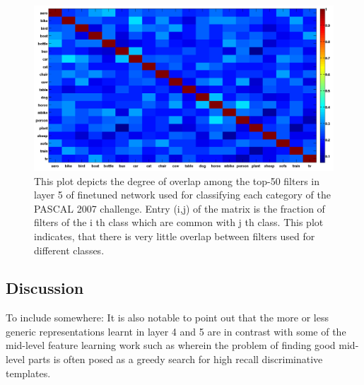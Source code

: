 \begin{figure}[t!]
\centering
\includegraphics[width=1.0\linewidth]{images/ftNet_commonfilters.png}
\caption{This plot depicts the degree of overlap among the top-50 filters in layer 5 of
finetuned network used for classifying each category of the PASCAL 2007 challenge. Entry
(i,j) of the matrix is the fraction of filters of the i th class which are common with j th class. This plot indicates, that there is very little overlap between filters used for different classes.}
\label{fig:svm-sel-dims}
\end{figure}




\subsection{Discussion}
To include somewhere: It is also notable to point out that the more or less generic representations learnt in layer 4 and 5 are in contrast with some of the mid-level feature learning work such as \cite{Blocks} \cite{Mid1} wherein the problem of finding good mid-level parts is often posed as a greedy search for high recall discriminative templates.


